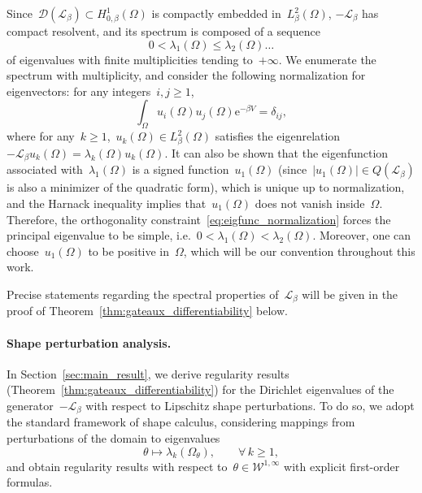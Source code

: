 \documentclass[a4]{article}
\newcommand{\cL}{\mathcal{L}}
\newcommand{\e}{\mathrm{e}}
\newcommand{\1}{\mathbbm 1}
\newcommand{\Winf}{{{\cW}^{1,\infty}}}
\newcommand{\cW}{\mathcal{W}}
\begin{document}
        Since~$\mathcal D(\cL_\beta)\subset H_{0,\beta}^1(\Omega)$ is compactly embedded in~$L^2_\beta(\Omega)$, $-\cL_\beta$ has compact resolvent, and its spectrum is composed of a sequence
        $$0<\lambda_1(\Omega) \leq \lambda_2(\Omega)\dots $$
        of eigenvalues with finite multiplicities tending to~$+\infty$. We enumerate the spectrum with multiplicity, and consider the following normalization for eigenvectors: for any integers~$i,j\geq 1$,
        \begin{equation}
            \label{eq:eigfunc_normalization}
            \int_{\Omega}u_{i}(\Omega)u_{j}(\Omega) \e^{-\beta V} = \delta_{ij},
        \end{equation}
        where for any~$k\geq 1$,~$u_{k}(\Omega)\in L^2_\beta(\Omega)$ satisfies the eigenrelation~$-\cL_\beta u_k(\Omega) = \lambda_k(\Omega)u_k(\Omega)$. It can also be shown that the eigenfunction associated with~$\lambda_1(\Omega)$ is a signed function~$u_1(\Omega)$ (since~$|u_1(\Omega)|\in Q(\cL_\beta)$ is also a minimizer of the quadratic form), which is unique up to normalization, and the Harnack inequality implies that~$u_1(\Omega)$ does not vanish inside~$\Omega$.
        Therefore, the orthogonality constraint~\eqref{eq:eigfunc_normalization} forces the principal eigenvalue to be simple, i.e.~$0<\lambda_1(\Omega)<\lambda_2(\Omega)$. Moreover, one can choose~$u_1(\Omega)$ to be positive in~$\Omega$, which will be our convention throughout this work.

        Precise statements regarding the spectral properties of~$\cL_\beta$ will be given in the proof of Theorem~\ref{thm:gateaux_differentiability} below.


    \paragraph{Shape perturbation analysis.}
        In Section~\ref{sec:main_result}, we derive regularity results (Theorem~\ref{thm:gateaux_differentiability}) for the Dirichlet eigenvalues of the generator~$-\cL_\beta$ with respect to Lipschitz shape perturbations.
        To do so, we adopt the standard framework of shape calculus, considering mappings from perturbations of the domain to eigenvalues
        \begin{equation}
            \theta\mapsto \lambda_k(\Omega_\theta),\qquad \forall\,k\geq 1,
        \end{equation}
        and obtain regularity results with respect to~$\theta\in\Winf$ with explicit first-order formulas.
\end{document}
